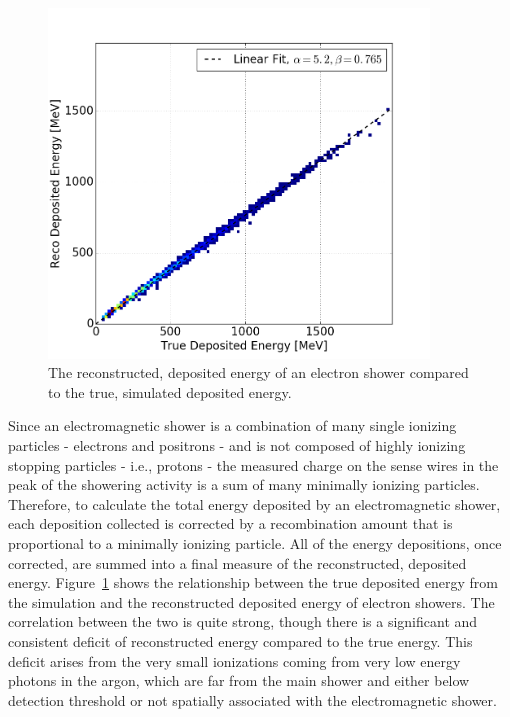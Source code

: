 \begin{figure}[htb]
   \centering
   \includegraphics[width=0.9\textwidth]{emshower_figures/depositedEnergyCalibration.png}
   \caption[Deposited Electron Energy]{The reconstructed, deposited energy of an electron shower compared to the true, simulated deposited energy.}
   \label{fig:depositedE}
 \end{figure} 

Since an electromagnetic shower is a combination of many single ionizing particles - electrons and positrons - and is not composed of highly ionizing stopping particles - i.e., protons - the measured charge on the sense wires in the peak of the showering activity is a sum of many minimally ionizing particles.  Therefore, to calculate the total energy deposited by an electromagnetic shower, each deposition collected is corrected by a recombination amount that is proportional to a minimally ionizing particle.  All of the energy depositions, once corrected, are summed into a final measure of the reconstructed, deposited energy.  Figure~\ref{fig:depositedE} shows the relationship between the true deposited energy from the simulation and the reconstructed deposited energy of electron showers.  The correlation between the two is quite strong, though there is a significant and consistent deficit of reconstructed energy compared to the true energy.  This deficit arises from the very small ionizations coming from very low energy photons in the argon, which are far from the main shower and either below detection threshold or not spatially associated with the electromagnetic shower.

